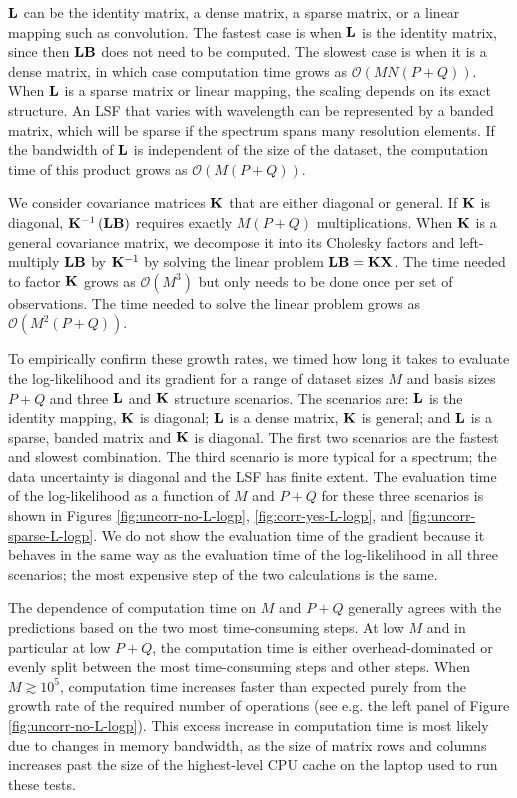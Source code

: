 \documentclass[trackchanges]{aastex62}
\newcommand{\vx}[1]{{\bf {#1}}}
\begin{document}
$\vx{L}$ can be the identity matrix, a dense matrix, a sparse matrix, or a linear mapping such as convolution.
The fastest case is when $\vx{L}$ is the identity matrix, since then $\vx{L}\vx{B}$ does not need to be computed.
The slowest case is when it is a dense matrix, in which case computation time grows as $\mathcal{O}(MN(P+Q))$.
When $\vx{L}$ is a sparse matrix or linear mapping, the scaling depends on its exact structure.
An LSF that varies with wavelength can be represented by a banded matrix, which will be sparse if the spectrum spans many resolution elements.
If the bandwidth of $\vx{L}$ is independent of the size of the dataset, the computation time of this product grows as $\mathcal{O}(M(P+Q))$.

We consider covariance matrices $\vx{K}$ that are either diagonal or general.
If $\vx{K}$ is diagonal, $\vx{K}^{-1} \left(\vx{L} \vx{B}\right)$ requires exactly $M(P+Q)$ multiplications.
When $\vx{K}$ is a general covariance matrix, we decompose it into its Cholesky factors and left-multiply $\vx{L} \vx{B}$ by $\vx{K}^{-1}$ by solving the linear problem $\vx{\vx{L} \vx{B}} = \vx{K} \vx{X}$.
The time needed to factor $\vx{K}$ grows as $\mathcal{O}\left(M^3\right)$ but only needs to be done once per set of observations.
The time needed to solve the linear problem grows as $\mathcal{O}\left(M^2 (P+Q)\right)$.

To empirically confirm these growth rates, we timed how long it takes to evaluate the log-likelihood and its gradient for a range of dataset sizes $M$ and basis sizes $P+Q$ and three $\vx{L}$ and $\vx{K}$ structure scenarios.
The scenarios are: $\vx{L}$ is the identity mapping, $\vx{K}$ is diagonal; $\vx{L}$ is a dense matrix, $\vx{K}$ is general; and $\vx{L}$ is a sparse, banded matrix and $\vx{K}$ is diagonal.
The first two scenarios are the fastest and slowest combination.
The third scenario is more typical for a spectrum; the data uncertainty is diagonal and the LSF has finite extent.
The evaluation time of the log-likelihood as a function of $M$ and $P+Q$ for these three scenarios is shown in Figures \ref{fig:uncorr-no-L-logp}, \ref{fig:corr-yes-L-logp}, and \ref{fig:uncorr-sparse-L-logp}.
We do not show the evaluation time of the gradient because it behaves in the same way as the evaluation time of the log-likelihood in all three scenarios; the most expensive step of the two calculations is the same.

The dependence of computation time on $M$ and $P+Q$ generally agrees with the predictions based on the two most time-consuming steps.
At low $M$ and in particular at low $P+Q$, the computation time is either overhead-dominated or evenly split between the most time-consuming steps and other steps.
When $M \gtrsim 10^5$, computation time increases faster than expected purely from the growth rate of the required number of operations (see e.g. the left panel of Figure \ref{fig:uncorr-no-L-logp}).
This excess increase in computation time is most likely due to changes in memory bandwidth, as the size of matrix rows and columns increases past the size of the highest-level CPU cache on the laptop used to run these tests.
\end{document}
